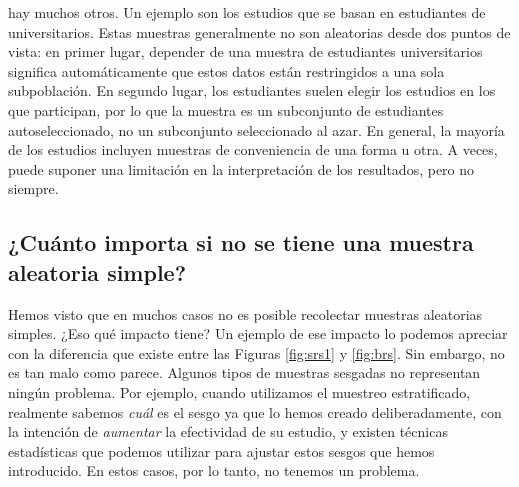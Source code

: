 \documentclass[spanish,]{book}
\begin{document}
\begin{itemize}
  hay muchos otros. Un ejemplo son los estudios que se basan en
  estudiantes de universitarios. Estas muestras generalmente no son
  aleatorias desde dos puntos de vista: en primer lugar, depender de una
  muestra de estudiantes universitarios significa automáticamente que
  estos datos están restringidos a una sola subpoblación. En segundo
  lugar, los estudiantes suelen elegir los estudios en los que
  participan, por lo que la muestra es un subconjunto de estudiantes
  autoseleccionado, no un subconjunto seleccionado al azar. En general,
  la mayoría de los estudios incluyen muestras de conveniencia de una
  forma u otra. A veces, puede suponer una limitación en la
  interpretación de los resultados, pero no siempre.
\end{itemize}

\subsection{¿Cuánto importa si no se tiene una muestra aleatoria
simple?}\label{cuanto-importa-si-no-se-tiene-una-muestra-aleatoria-simple}

Hemos visto que en muchos casos no es posible recolectar muestras
aleatorias simples. ¿Eso qué impacto tiene? Un ejemplo de ese impacto lo
podemos apreciar con la diferencia que existe entre las Figuras
\ref{fig:srs1} y \ref{fig:brs}. Sin embargo, no es tan malo como parece.
Algunos tipos de muestras sesgadas no representan ningún problema. Por
ejemplo, cuando utilizamos el muestreo estratificado, realmente sabemos
\emph{cuál} es el sesgo ya que lo hemos creado deliberadamente, con la
intención de \emph{aumentar} la efectividad de su estudio, y existen
técnicas estadísticas que podemos utilizar para ajustar estos sesgos que
hemos introducido. En estos casos, por lo tanto, no tenemos un problema.
\end{document}
